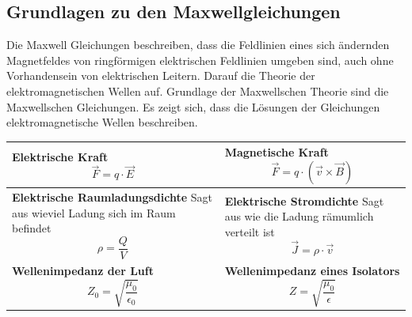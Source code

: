 \subsection{Grundlagen zu den Maxwellgleichungen}
Die Maxwell Gleichungen beschreiben, dass die Feldlinien eines sich ändernden Magnetfeldes von ringförmigen elektrischen Feldlinien umgeben sind, auch ohne Vorhandensein von elektrischen Leitern. Darauf die Theorie der elektromagnetischen Wellen auf. Grundlage der Maxwellschen Theorie sind die Maxwellschen Gleichungen. Es zeigt sich, dass die Lösungen der Gleichungen elektromagnetische Wellen beschreiben.\\
\begin{tabular}{|p{} |p{}|}
	\hline
	\textbf{Elektrische Kraft}\newline
	\[\vec{F}=q\cdot \vec{E}\]&
	\textbf{Magnetische Kraft}\newline
	\[\vec{F}=q\cdot(\vec{v}\times \vec{B})\]\\
	\hline
	\textbf{Elektrische Raumladungsdichte}\newline
	Sagt aus wieviel Ladung sich im Raum befindet\newline
	\[ \rho  = \frac{Q}{V}\]&
	\textbf{Elektrische Stromdichte}\newline
	Sagt aus wie die Ladung rämumlich verteilt ist\newline
	\[\vec{J}=\rho \cdot \vec{v}\]\\
	\hline
	\textbf{Wellenimpedanz der Luft}\newline
	\[Z_{0}=\sqrt{\frac{\mu_{0}}{\epsilon_{0}}} \]&
	\textbf{Wellenimpedanz eines Isolators}\newline
	\[Z=\sqrt{\frac{\mu_{0}}{\epsilon}} \]\\
	\hline
\end{tabular}
